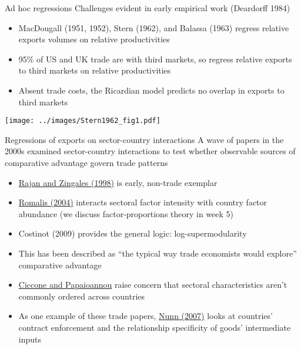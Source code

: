 \documentclass[10pt,notes=hide]{beamer}
\begin{document}
\begin{frame}{Ad hoc regressions}
Challenges evident in early empirical work (Deardorff 1984)
\begin{itemize}
	\item MacDougall (1951, 1952), Stern (1962), and Balassa (1963) regress relative exports volumes on relative productivities
	\item 95\% of US and UK trade are with third markets, so regress relative exports to third markets on relative productivities
	\item Absent trade costs, the Ricardian model predicts no overlap in exports to third markets
\end{itemize}
\begin{center}
\texttt{[image: ../images/Stern1962\_fig1.pdf]}
\end{center}
\end{frame}
\begin{frame}{Regressions of exports on sector-country interactions}
A wave of papers in the 2000s examined sector-country interactions to test 
whether observable sources of comparative advantage govern trade patterns
\begin{itemize}
	\item \href{https://ideas.repec.org/a/aea/aecrev/v88y1998i3p559-86.html}{Rajan and Zingales (1998)} is early, non-trade exemplar
	\item \href{https://www.aeaweb.org/articles?id=10.1257/000282804322970715}{Romalis (2004)} interacts sectoral factor intensity with country factor abundance (we discuss factor-proportions theory in week 5)
	\item Costinot (2009) provides the general logic: log-supermodularity
	\item This has been described as ``the typical way trade economists would explore'' comparative advantage
	\item \href{https://www.nber.org/papers/w22368}{Ciccone and Papaioannou} raise concern that sectoral characteristics aren't commonly ordered across countries
	\item As one example of these trade papers, \href{https://academic.oup.com/qje/article/122/2/569/1942086}{Nunn (2007)} looks at countries' contract enforcement and the relationship specificity of goods' intermediate inputs
\end{itemize}
%
\end{frame}
\end{document}
